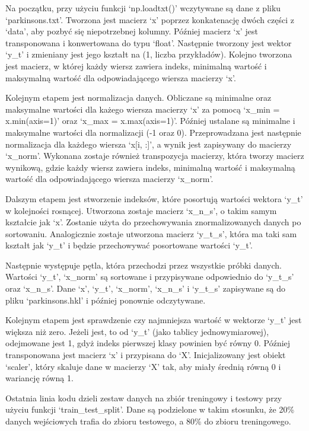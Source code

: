 \documentclass{article}
\begin{document}
Na początku, przy użyciu funkcji `np.loadtxt()' wczytywane są dane z pliku `parkinsons.txt'.
Tworzona jest macierz `x' poprzez konkatenację dwóch części z `data', aby pozbyć się niepotrzebnej kolumny.
Później macierz `x' jest transponowana i konwertowana do typu `float'.
Następnie tworzony jest wektor `y\_t' i zmieniany jest jego kształt na (1, liczba przykładów).
Kolejno tworzona jest macierz, w której każdy wiersz zawiera indeks, minimalną wartość i maksymalną wartość dla odpowiadającego wiersza macierzy `x'.

Kolejnym etapem jest normalizacja danych.
Obliczane są minimalne oraz maksymalne wartości dla każego wiersza macierzy `x' za pomocą `x\_min = x.min(axis=1)' oraz `x\_max = x.max(axis=1)'.
Później ustalane są minimalne i maksymalne wartości dla normalizacji (-1 oraz 0).
Przeprowadzana jest następnie normalizacja dla każdego wiersza `x[i, :]', a wynik jest zapisywany do macierzy `x\_norm'.
Wykonana zostaje również transpozycja macierzy, która tworzy macierz wynikową, gdzie każdy wiersz zawiera indeks, minimalną wartość i maksymalną wartość dla odpowiadającego wiersza macierzy `x\_norm'.

Dalszym etapem jest stworzenie indeksów, które posortują wartości wektora `y\_t' w kolejności rosnącej.
Utworzona zostaje macierz `x\_n\_s', o takim samym kształcie jak `x'. Zostanie użyta do przechowywania znormalizowanych danych po sortowaniu.
Analogicznie zostaje utworzona macierz `y\_t\_s', która ma taki sam kształt jak `y\_t' i będzie przechowywać posortowane wartości `y\_t'.

Następnie występuje pętla, która przechodzi przez wszystkie próbki danych.
Wartości `y\_t', `x\_norm' są sortowane i przypisywane odpowiednio do `y\_t\_s' oraz `x\_n\_s'.
Dane `x', `y\_t', `x\_norm', `x\_n\_s' i `y\_t\_s' zapisywane są do pliku `parkinsons.hkl' i później ponownie odczytywane.

Kolejnym etapem jest sprawdzenie czy najmniejsza wartość w wektorze `y\_t' jest większa niż zero.
Jeżeli jest, to od `y\_t' (jako tablicy jednowymiarowej), odejmowane jest 1, gdyż indeks pierwszej klasy powinien być równy 0.
Później transponowana jest macierz `x' i przypisana do `X'.
Inicjalizowany jest obiekt `scaler', który skaluje dane w macierzy `X' tak, aby miały średnią równą 0 i wariancję równą 1.

Ostatnia linia kodu dzieli zestaw danych na zbiór treningowy i testowy przy użyciu funkcji `train\_test\_split'.
Dane są podzielone w takim stosunku, że 20\% danych wejściowych trafia do zbioru testowego, a 80\% do zbioru treningowego.
\end{document}

